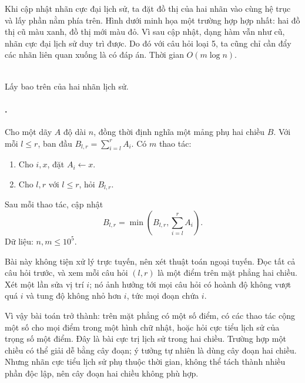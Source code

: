 \documentclass[11pt]{article}
\begin{document}
Khi cập nhật nhãn cực đại lịch sử, ta đặt đồ thị của hai nhãn vào cùng hệ trục
và lấy phần nằm phía trên. Hình dưới minh họa một trường hợp hợp nhất: hai đồ
thị cũ màu xanh, đồ thị mới màu đỏ. Vì sau cập nhật, dạng hàm vẫn như cũ, nhãn
cực đại lịch sử duy trì được. Do đó với câu hỏi loại 5, ta cũng chỉ cần đẩy các
nhãn liên quan xuống là có đáp án. Thời gian \(O(m\log n)\).

\begin{center}
\\[-0.2em]
{\small Lấy bao trên của hai nhãn lịch sử.}
\end{center}

\paragraph{.}
Cho một dãy \(A\) độ dài \(n\), đồng thời định nghĩa một mảng phụ hai chiều
\(B\). Với mỗi \(l\le r\), ban đầu \(B_{l,r}=\sum_{i=l}^{r}A_i\). Có \(m\)
thao tác:
\begin{enumerate}
  \item Cho \(i,x\), đặt \(A_i\leftarrow x\).
  \item Cho \(l,r\) với \(l\le r\), hỏi \(B_{l,r}\).
\end{enumerate}
Sau mỗi thao tác, cập nhật
\[
  B_{l,r}=\min\left(B_{l,r},\sum_{i=l}^{r}A_i\right).
\]
Dữ liệu: \(n,m\le 10^5\).

Bài này không tiện xử lý trực tuyến, nên xét thuật toán ngoại tuyến. Đọc tất
cả câu hỏi trước, và xem mỗi câu hỏi \((l,r)\) là một điểm trên mặt phẳng hai
chiều. Xét một lần sửa vị trí \(i\); nó ảnh hưởng tới mọi câu hỏi có hoành độ
không vượt quá \(i\) và tung độ không nhỏ hơn \(i\), tức mọi đoạn chứa \(i\).

Vì vậy bài toán trở thành: trên mặt phẳng có một số điểm, có các thao tác
cộng một số cho mọi điểm trong một hình chữ nhật, hoặc hỏi cực tiểu lịch sử
của trọng số một điểm. Đây là bài cực trị lịch sử trong hai chiều. Trường hợp
một chiều có thể giải dễ bằng cây đoạn; ý tưởng tự nhiên là dùng cây đoạn hai
chiều. Nhưng nhãn cực tiểu lịch sử phụ thuộc thời gian, không thể tách thành
nhiều phần độc lập, nên cây đoạn hai chiều không phù hợp.
\end{document}
